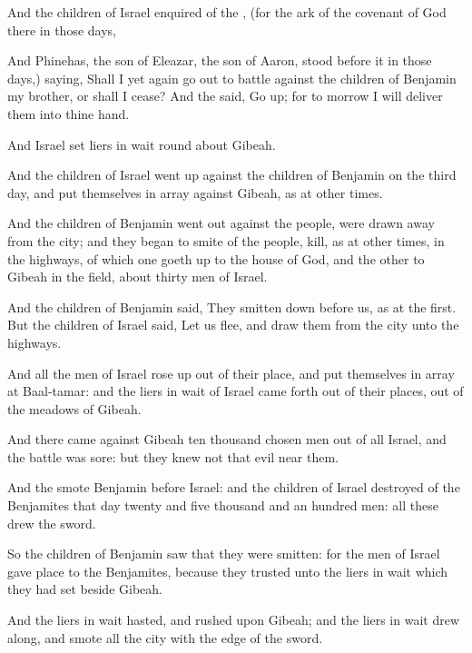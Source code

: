 {And the
children of
Israel
enquired of the
{}, (for the
ark of the
covenant of
God
{} there in those
days,

And
Phinehas, the
son of
Eleazar, the
son of
Aaron,
stood
before it in those
days,)
saying, Shall I yet
again go
out to
battle against the
children of
Benjamin my
brother, or shall I
cease? And the
{}
said, Go
up; for to
morrow I will
deliver them into thine
hand.

And
Israel
set liers in
wait round
about
Gibeah.

And the
children of
Israel went
up against the
children of
Benjamin on the
third
day, and put themselves in
array against
Gibeah, as at other
times.

And the
children of
Benjamin went
out
against the
people,
{} were drawn
away from the
city; and they
began to
smite of the
people,
{}
kill, as at other
times, in the
highways, of which
one goeth
up to the
house of
God, and the
other to
Gibeah in the
field, about
thirty
men of
Israel.

And the
children of
Benjamin
said, They
{} smitten
down
before us, as at the
first. But the
children of
Israel
said, Let us
flee, and
draw them from the
city unto the
highways.

And all the
men of
Israel rose
up out of their
place, and put themselves in
array at
Baal-tamar: and the liers in
wait of
Israel came
forth out of their
places,
{} out of the
meadows of
Gibeah.

And there
came
against
Gibeah
ten
thousand
chosen
men out of all
Israel, and the
battle was
sore: but they
knew not that
evil
{}
near them.

And the
{}
smote
Benjamin
before
Israel: and the
children of
Israel
destroyed of the
Benjamites that
day
twenty and
five
thousand and an
hundred
men: all these
drew the
sword.

So the
children of
Benjamin
saw that they were
smitten: for the
men of
Israel
gave
place to the
Benjamites, because they
trusted unto the liers in
wait which they had
set beside
Gibeah.

And the liers in
wait
hasted, and
rushed upon
Gibeah; and the liers in
wait drew
{}
along, and
smote all the
city with the
edge of the
sword.

}
